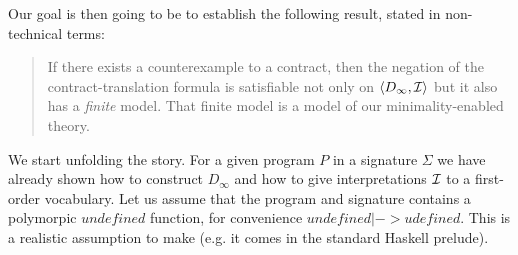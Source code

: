 

Our goal is then going to be to establish the following result, stated in non-technical terms:
\begin{quote}
If there exists a counterexample to a contract, then the negation of the contract-translation
formula is satisfiable not only on $\langle D_\infty,{\cal I}\rangle$ but it also has a {\em finite}
model. That finite model is a model of our minimality-enabled theory.
\end{quote}

We start unfolding the story. For a given program $P$ in a signature $\Sigma$ we have already
shown how to construct $D_\infty$ and how to give interpretations ${\cal I}$ to a first-order
vocabulary. Let us assume that the program and signature contains a polymorpic $undefined$
function, for convenience $undefined |-> udefined$. This is a realistic assumption to make
(e.g. it comes in the standard Haskell prelude).

